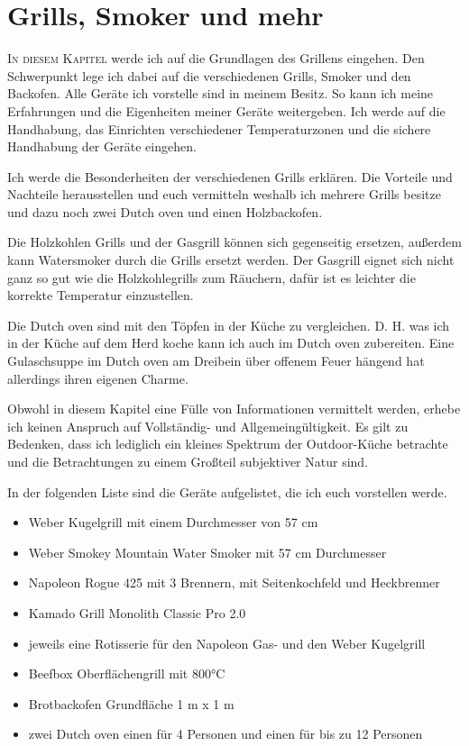 \chapter{Grills, Smoker und mehr}\label{Chapter1}

	\lettrine[lines=3]{I}{n diesem Kapitel} werde ich auf die Grundlagen des Grillens 
	eingehen. Den Schwerpunkt lege ich dabei auf die
	verschiedenen Grills, Smoker und den Backofen. Alle Geräte ich vorstelle sind 
	in meinem Besitz. So kann ich  meine Erfahrungen und die Eigenheiten meiner
	Geräte weitergeben. Ich werde auf die Handhabung, das Einrichten verschiedener
	Temperaturzonen und die sichere Handhabung der Geräte eingehen.
	
	Ich werde die Besonderheiten der verschiedenen Grills erklären. Die Vorteile 
	und Nachteile herausstellen und euch vermitteln
	weshalb ich mehrere Grills besitze und dazu noch zwei Dutch oven und einen 
	Holzbackofen.
	
	Die Holzkohlen Grills und der Gasgrill können sich gegenseitig ersetzen, 
	außerdem kann Watersmoker durch die Grills
	ersetzt werden. Der Gasgrill eignet sich nicht ganz so gut wie die 
	Holzkohlegrills zum Räuchern, dafür ist es leichter die korrekte Temperatur
	einzustellen.
	
	Die Dutch oven sind mit den Töpfen in der Küche zu vergleichen. D. H. was ich 
	in der Küche auf dem Herd koche kann ich auch im Dutch oven zubereiten. 
	Eine Gulaschsuppe im Dutch oven am Dreibein über offenem Feuer hängend
	hat allerdings ihren eigenen Charme.
	
	Obwohl in diesem Kapitel eine Fülle von Informationen vermittelt werden, erhebe ich keinen Anspruch auf Vollständig- und Allgemeingültigkeit. Es gilt zu Bedenken, dass 
	ich lediglich ein kleines Spektrum der Outdoor-Küche betrachte und die Betrachtungen zu einem Großteil subjektiver Natur sind.



In der folgenden Liste sind die Geräte aufgelistet, die ich euch vorstellen werde.

\begin{itemize}[noitemsep]
	\item Weber Kugelgrill mit einem Durchmesser von 57 cm
	\item Weber Smokey Mountain Water Smoker mit 57 cm Durchmesser
 	\item Napoleon Rogue 425 mit 3 Brennern, mit Seitenkochfeld und 
 	Heckbrenner
	\item Kamado Grill Monolith Classic Pro 2.0
	\item jeweils eine Rotisserie für den Napoleon Gas- und den Weber Kugelgrill
	\item Beefbox Oberflächengrill mit 800°C
	\item Brotbackofen Grundfläche 1 m x 1 m
	\item zwei Dutch oven einen für 4 Personen und einen für bis zu 12 Personen
\end{itemize}

